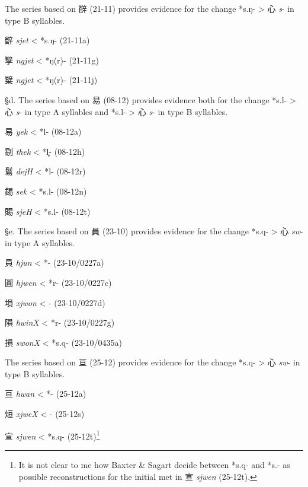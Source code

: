 The series based on 辥 (21-11) provides evidence for the change *s.ŋ-
\textgreater{} 心  \emph{s}- in type B syllables.

\begin{description} \item
辥  \emph{sjet} \textless{} *s.ŋ- (21-11a)
\item
孼  \emph{ngjet} \textless{} *ŋ(r)- (21-11g)
 \item
櫱  \emph{ngjet} \textless{} *ŋ(r)- (21-11j)
\end{description}

§d. The series based on 易 (08-12) provides evidence both for the change
*s.l{}- \textgreater{} 心  \emph{s}- in type A syllables and *s.l-
\textgreater{} 心  \emph{s}- in type B syllables.

\begin{description} \item
易  \emph{yek} \textless{} *l- (08-12a)
\item
剔  \emph{thek} \textless{} *l̥{}- (08-12h)
 \item
鬄  \emph{dejH} \textless{} *l- (08-12r)
\item
錫  \emph{sek} \textless{} *s.l{}- (08-12n)
\item
賜  \emph{sjeH} \textless{} *s.l- (08-12t)
\end{description}

§e. The series based on 員 (23-10) provides evidence for the change
*s.q{}- \textgreater{} 心  \emph{sw}- in type A syllables.

\begin{description} \item
員  \emph{hjun} \textless{} *{}- (23-10/0227a)
 \item
圓  \emph{hjwen} \textless{} *{}r- (23-10/0227c)
 \item
塤  \emph{xjwon} \textless{} {}- (23-10/0227d)
 \item
隕  \emph{hwinX} \textless{} *{}r- (23-10/0227g)
 \item
損  \emph{swonX} \textless{} *s.q{}- (23-10/0435a)
\end{description}

The series based on 亘 (25-12) provides evidence for the change *s.q{}-
\textgreater{} 心  \emph{sw}- in type B syllables.

\begin{description} \item
亘  \emph{hwan} \textless{} *{}- (25-12a)
 \item
烜  \emph{xjweX} \textless{} {}- (25-12s)
 \item
宣  \emph{sjwen} \textless{} *s.q{}- (25-12t)\footnote{It is not clear to
  me how Baxter \& Sagart decide between *s.q{}- and *s.{}- as possible
  re­con­struct­ions for the initial met in 宣  \emph{sjwen} (25-12t). }
\end{description}

